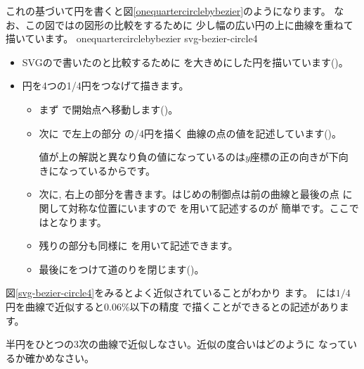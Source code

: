 これの基づいて円を書くと図\ref{onequartercirclebybezier}のようになります。
なお、この図ではの図形の比較をするために
少し幅の広い円の上に\Bezier 曲線を重ねて
描いています。
{onequartercirclebybezier}
%
{svg-bezier-circle4}
\begin{itemize}
 \item SVGので書いたのと比較するために
       を大きめにした円を描いています()。
 \item 円を4つの1/4円をつなげて描きます。
\begin{itemize}
 \item まず で開始点へ移動します()。
 \item 次に  で左上の部分
       の{/4}円を描く
       {\Bezier}曲線の点の値を記述しています()。

      値が上の解説と異なり負の値になっているのは$y$座標の正の向きが下向
       きになっているからです。
 \item 次に, 右上の部分を書きます。はじめの制御点は前の{\Bezier}曲線と最後の点
       に関して対称な位置にいますので を用いて記述するのが
       簡単です。ここではとなります。
 \item 残りの部分も同様に を用いて記述できます。
 \item 最後にをつけて道のりを閉じます()。
\end{itemize}
\end{itemize}
図\ref{svg-bezier-circle4}をみるとよく近似されていることがわかり
ます。
\cite[p.14]{Metafont}には$1/4$円を\Bezier 曲線で近似すると0.06\%以下の精度
で描くことができるとの記述があります。
\iffalse
\begin{Problem}
 上記の値を用いて半径$100$の円との誤差の割合を計算しなさい。
\end{Problem}
\fi
\begin{Problem}\upshape
 半円をひとつの3次の\Bezier 曲線で近似しなさい。近似の度合いはどのように
 なっているか確かめなさい。
\end{Problem}

\fi

